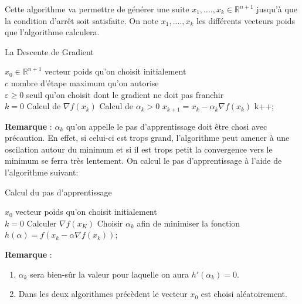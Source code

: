 \documentclass{article}
\begin{document}
	Cette algorithme va permettre de générer une suite  $x_{1},....,x_{k} \in \mathbb{R}^{n+1}$ jusqu'à que la condition d'arrêt soit satisfaite. On note $x_{1},....,x_{k}$ les différents vecteurs poids que l'algorithme calculera.
\newpage
	\begin{algorithm}
	\caption{La Descente de Gradient}
	\begin{algorithmic}
	\REQUIRE $x_{0} \in \mathbb{R}^{n+1}$ vecteur poids qu'on choisit initialement \\ 
	$c$ nombre d'étape maximum qu'on autorise  \\ %
	$\varepsilon \ge 0$ seuil qu'on choisit dont le gradient ne doit pas franchir \\ 
	$k=0$
		\STATE Calcul de $\nabla f(x_{k})$ \; %
		\STATE Calcul de $\alpha_{k} > 0 $ \;
		\STATE $ x_{k+1} = x_{k} - \alpha_{k} \nabla f(x_{k}) $ \;
		\STATE k++; 
	\ENDWHILE
	\end{algorithmic}
	\end{algorithm} 
\textbf{Remarque }: $\alpha_{k}$ qu'on appelle le pas d'apprentissage doit être chosi avec précaution. En effet, si celui-ci est trops grand, l'algorithme peut amener à une oscilation autour du minimum et si il est trops petit la convergence vers le minimum se ferra très lentement. 
On calcul le pas d'apprentissage à l'aide de l'algorithme suivant: 
	\begin{algorithm}
	\caption{Calcul du pas d'apprentissage}
	\begin{algorithmic}
	\REQUIRE $x_{0}$ vecteur poids qu'on choisit initialement \\ 
	$k=0$
	\STATE Calculer $\nabla f(x_{K})$ \; 
	\STATE Choisir $\alpha_{k}$ afin de minimiser la fonction $h(\alpha) = f(x_{k}-\alpha \nabla f(x_{k}))$;
	\end{algorithmic}
	\end{algorithm} 

\textbf{Remarque } :\begin{enumerate} 
	\item $\alpha_{k}$ sera bien-sûr la valeur pour laquelle on aura $h'(\alpha_{k}) = 0$.
	\item Dans les deux algorithmes précèdent le vecteur $x_{0}$ est choisi aléatoirement. 
	\end{enumerate}

\end{document}

